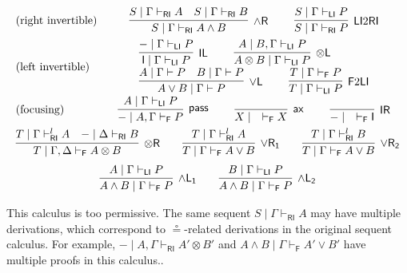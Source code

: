 \documentclass[submission,copyright,creativecommons]{eptcs}
\theoremstyle{definition}
\newcommand{\tl}{\otimes \mathsf{L}}
\newcommand{\tr}{\otimes \mathsf{R}}
\newcommand{\pass}{\mathsf{pass}}
\newcommand{\unitl}{\mathsf{IL}}
\newcommand{\unitr}{\mathsf{IR}}
\newcommand{\andlone}{\land \mathsf{L_{1}}}
\newcommand{\andltwo}{\land \mathsf{L_{2}}}
\newcommand{\andr}{\land \mathsf{R}}
\newcommand{\orl}{\lor \mathsf{L}}
\newcommand{\orrone}{\lor \mathsf{R_{1}}}
\newcommand{\orrtwo}{\lor \mathsf{R_{2}}}
\newcommand{\ax}{\mathsf{ax}}
\newcommand{\ot}{\otimes}
\newcommand{\I}{\mathsf{I}}
\newcommand{\RI}{\mathsf{RI}}
\newcommand{\LI}{\mathsf{LI}}
\newcommand{\F}{\mathsf{F}}
\newcommand{\proofbox}[1]{\begin{tabular}{l} #1 \end{tabular}}
\newcommand\niccolo[1]{\mbox{}
{\marginpar{\color{red}NV}}
{\sf\noindent\color{red}#1}}%
\begin{document}
\begin{equation}\label{eq:naive:focus}
  \begin{array}{lc}
    \text{(right invertible)} & %
    \proofbox{
      \infer[\andr]{S \mid \Gamma \vdash_{\RI} A \land B}{
        S \mid \Gamma \vdash_{\RI} A
        &
        S \mid \Gamma \vdash_{\RI} B
      }
    \qquad
    \infer[\LI 2 \RI]{S \mid \Gamma \vdash_{\RI} P}{S \mid \Gamma \vdash_{\LI} P}
    }
    \\[10pt]
    \text{(left invertible)} & %
    \proofbox{
      \infer[\unitl]{\I \mid \Gamma \vdash_{\LI} P}{{-} \mid \Gamma \vdash_{\LI} P}
    \qquad
    \infer[\tl]{A \ot B \mid \Gamma \vdash_{\LI} P}{A \mid B , \Gamma \vdash_{\LI} P}
    \\
    \infer[\orl]{A \lor B \mid \Gamma \vdash P}{
      A \mid \Gamma \vdash P
      &
      B \mid \Gamma \vdash P
    }
    \qquad
    \infer[\F 2 \LI]{T \mid \Gamma \vdash_{\LI} P}{T \mid \Gamma \vdash_{\F} P}
    }
    \\[10pt]
    \text{(focusing)} &    %
    \proofbox{
    \infer[\pass]{{-} \mid A , \Gamma \vdash_{\F} P }{
        A \mid \Gamma \vdash_{\LI} P
    }
    \qquad
    \infer[\ax]{X \mid \quad \vdash_{\F} X}{}
    \qquad
    \infer[\unitr]{{-} \mid \quad \vdash_{\F} \I}{}
    }
    \\[10pt]
    \multicolumn{2}{c}{
    \infer[\tr]{T \mid \Gamma , \Delta \vdash_{\F} A \ot B}{
      T \mid \Gamma \vdash^{l}_{\RI} A
      &
      {-} \mid \Delta \vdash_{\RI} B
    }
    \qquad
    \infer[\orrone]{T \mid \Gamma \vdash_{\F} A \lor B}{
      T \mid \Gamma \vdash^{l}_{\RI} A
    }
    \qquad
    \infer[\orrtwo]{T \mid \Gamma \vdash_{\F} A \lor B}{
      T \mid \Gamma \vdash^{l}_{\RI} B
    }
    }
    \\[6pt]
    \multicolumn{2}{c}{
    \infer[\andlone]{A \land B \mid \Gamma \vdash_{\F} P}{A \mid \Gamma \vdash_{\LI} P}
    \qquad
    \infer[\andltwo]{A \land B \mid \Gamma \vdash_{\F} P}{B \mid \Gamma \vdash_{\LI} P}
    }
  \end{array}
\end{equation}

This calculus is too permissive. The same sequent $S \mid \Gamma \vdash_{\RI} A$ may have multiple derivations, which correspond to $\circeq$-related derivations in the original sequent calculus. For example, $- \mid A , \Gamma \vdash_{\RI} A' \ot B'$ and $A \land B \mid \Gamma \vdash_{\F} A' \lor B'$ have multiple proofs in this calculus..
\end{document}
